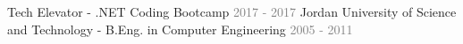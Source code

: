 \begin{cventries}\vspace{-10mm}
\cventry 
    {}
    {}
    {}
    {}
    {}\vspace{-8mm}  
\cventry 
    {}
    {\hspace*{0.5mm}\bullet \hspace*{0.5mm} Tech Elevator - \textmd{.NET Coding Bootcamp}}
    {\textcolor{graytext}{2017 - 2017}}
    {}
    {}\vspace{-8mm} 
\cventry
    {}
    {\hspace*{0.5mm}\bullet \hspace*{0.5mm} Jordan University of Science and Technology - \textmd{B.Eng. in Computer Engineering}}
    {\textcolor{graytext}{2005 - 2011}}
    {}
    {}
\end{cventries}
